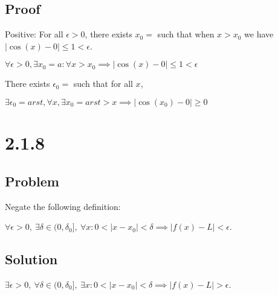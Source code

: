 \documentclass[12pt]{article}
\newcommand{\abs}  [1]{\left|       #1 \right|      }
\begin{document}
\subsection*{Proof}
Positive:
For all $\epsilon > 0$, there exists $x_0 = $ such that when $x > x_0$ we have $\abs{\cos(x) - 0} \leq 1 < \epsilon$.

$\forall \epsilon > 0, \exists x_0 = a : \forall x > x_0 \implies \abs{\cos(x) - 0} \leq 1 < \epsilon$

There exists $\epsilon_0 = $ such that for all $x$,

$\exists \epsilon_0 = arst, \forall x, \exists x_0 = arst > x \implies \abs{\cos(x_0) - 0} \geq 0$



\section*{2.1.8}

\subsection*{Problem}

Negate the following definition:

$\forall \epsilon > 0,\ \exists \delta \in (0, \delta_0],\ \forall x : 0 < \abs{x - x_0} < \delta \implies \abs{f(x) - L} < \epsilon$.

\subsection*{Solution}
$\exists \epsilon > 0,\ \forall \delta \in (0, \delta_0],\ \exists x : 0 < \abs{x - x_0} < \delta \implies \abs{f(x) - L} > \epsilon$.
\end{document}
